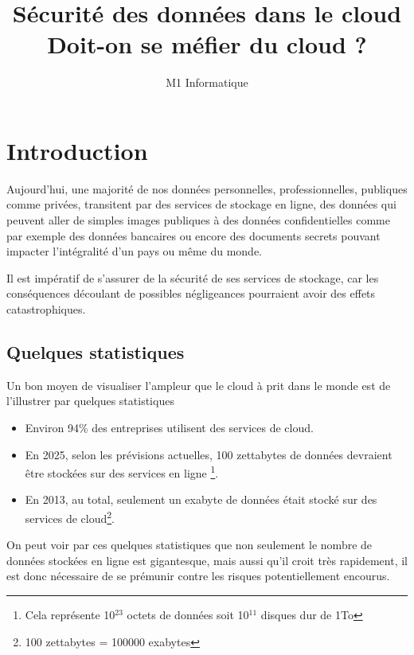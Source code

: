 \documentclass[a4paper, 12pt]{article}
\title{Sécurité des données dans le cloud\\Doit-on se méfier du cloud ?}
\author{M1 Informatique}
\date{}
\begin{document}
  \maketitle
  \newpage
  \tableofcontents
  \newpage

  \section{Introduction}
    Aujourd'hui, une majorité de nos données personnelles, professionnelles,
    publiques comme privées, transitent par des services de stockage en ligne,
    des données qui peuvent aller de simples images publiques à des données
    confidentielles comme par exemple des données bancaires ou encore des
    documents secrets pouvant impacter l'intégralité d'un pays ou même du monde.

    Il est impératif de s'assurer de la sécurité de ses services de stockage,
    car les conséquences découlant de possibles négligeances pourraient avoir
    des effets catastrophiques.

    \subsection{Quelques statistiques}
      Un bon moyen de visualiser l'ampleur que le cloud à prit dans le monde est
      de l'illustrer par quelques statistiques
      \begin{itemize}
        \item Environ 94\% des entreprises utilisent des services de cloud.
        \item En 2025, selon les prévisions actuelles, 100 zettabytes de données
              devraient être stockées sur des services en ligne
              \footnote{Cela représente 10$^{23}$ octets de données soit
              10$^{11}$ disques dur de 1To}.
        \item En 2013, au total, seulement un exabyte de données était stocké
              sur des services de cloud\footnote{100 zettabytes = 100000
              exabytes}.
      \end{itemize}

      On peut voir par ces quelques statistiques que non seulement le nombre de
      données stockées en ligne est gigantesque, mais aussi qu'il croit très
      rapidement, il est donc nécessaire de se prémunir contre les risques
      potentiellement encourus.
\end{document}
